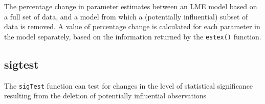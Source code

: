 \documentclass[12pt, a4paper]{article}
\begin{document}
The percentage change in parameter estimates between an LME model based on a full set of data, and a model from which a (potentially influential)
subset of data is removed. A value of percentage change is calculated for each parameter in the
model separately, based on the information returned by the \texttt{estex()} function.

\subsection*{sigtest}

The \texttt{sigTest} function can test for changes in the level of statistical significance resulting from
the deletion of potentially influential observations
\end{document}
